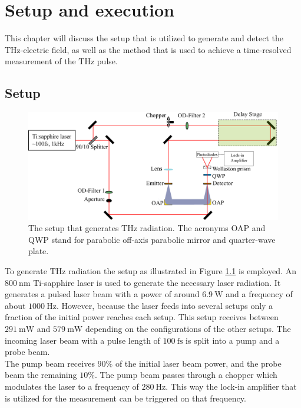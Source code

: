 \chapter{Setup and execution}
This chapter will discuss the setup that is utilized to generate and detect the $\si{\tera\hertz}$-electric field, as well as the method that is used to achieve a time-resolved measurement of the $\si{\tera\hertz}$ pulse.

\section{Setup}
\label{sec:setup}
\begin{figure}
    \centering
    \includegraphics[width=\textwidth]{Plots/Aufbau.pdf}
    \caption{The setup that generates $\si{\tera\hertz}$ radiation.
    The acronyms OAP and QWP stand for parabolic off-axis parabolic mirror and quarter-wave plate. }
    \label{fig:setup}
\end{figure}
To generate $\si{\tera\hertz}$ radiation the setup as illustrated in Figure \ref{fig:setup} is employed.
An $\SI{800}{\nano\meter}$ Ti-sapphire laser is used to generate the necessary laser radiation.
It generates a pulsed laser beam with a power of around $\SI{6.9}{\W}$ and a frequency of about $\SI{1000}{\Hz}$.
However, because the laser feeds into several setups only a fraction of the initial power reaches each setup.
This setup receives between $\SI{291}{\milli\W}$ and $\SI{579}{\milli\W}$ depending on the configurations of the other setups. 
The incoming laser beam with a pulse length of $\SI{100}{\femto\second}$ is split into a pump and a probe beam.
\\
The pump beam receives $90\%$ of the initial laser beam power, and the probe beam the remaining $10\%$.
The pump beam passes through a chopper which modulates the laser to a frequency of $\SI{280}{\hertz}$.
This way the lock-in amplifier that is utilized for the measurement can be triggered on that frequency.
